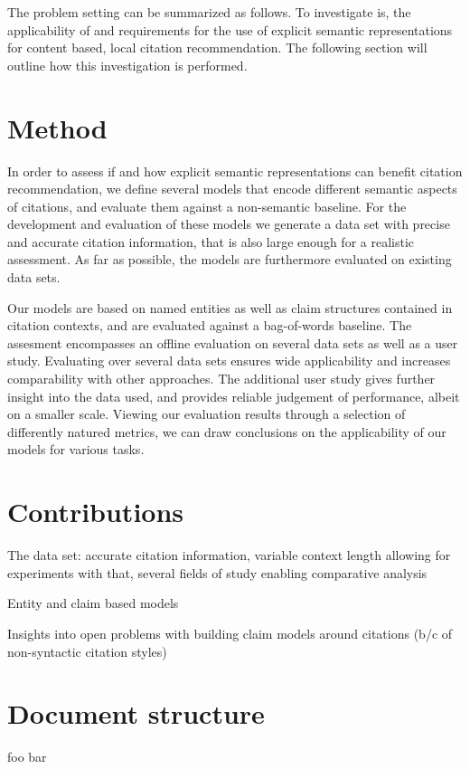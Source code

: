 The problem setting can be summarized as follows. To investigate is, the applicability of and requirements for the use of explicit semantic representations for content based, local citation recommendation. The following section will outline how this investigation is performed.

\section{Method}\label{sec:method}
In order to assess if and how explicit semantic representations can benefit citation recommendation, we define several models that encode different semantic aspects of citations, and evaluate them against a non-semantic baseline. For the development and evaluation of these models we generate a data set with precise and accurate citation information, that is also large enough for a realistic assessment. As far as possible, the models are furthermore evaluated on existing data sets.

Our models are based on named entities as well as claim structures contained in citation contexts, and are evaluated against a bag-of-words baseline. The assesment encompasses an offline evaluation on several data sets as well as a user study. Evaluating over several data sets ensures wide applicability and increases comparability with other approaches. The additional user study gives further insight into the data used, and provides reliable judgement of performance, albeit on a smaller scale. Viewing our evaluation results through a selection of differently natured metrics, we can draw conclusions on the applicability of our models for various tasks.

\section{Contributions}\label{sec:contributions}
The data set: accurate citation information, variable context length allowing for experiments with that, several fields of study enabling comparative analysis

Entity and claim based models

Insights into open problems with building claim models around citations (b/c of non-syntactic citation styles)

\section{Document structure}\label{sec:documentstructure}
foo bar
